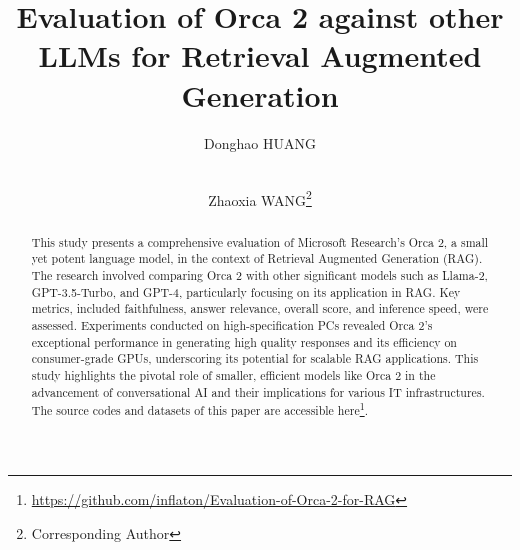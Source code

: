 \documentclass[runningheads]{llncs}
\begin{document}
%

\title{Evaluation of Orca 2 against other LLMs for Retrieval Augmented Generation}

\author{Donghao HUANG \and \\
Zhaoxia WANG\thanks{Corresponding Author}}

%

%
%
%
%
%
\maketitle              %
%
\begin{abstract}
This study presents a comprehensive evaluation of Microsoft Research's Orca 2, a small yet potent language model, in the context of Retrieval Augmented Generation (RAG). The research involved comparing Orca 2 with other significant models such as Llama-2, GPT-3.5-Turbo, and GPT-4, particularly focusing on its application in RAG. Key metrics, included faithfulness, answer relevance, overall score, and inference speed, were assessed. Experiments conducted on high-specification PCs revealed Orca 2's exceptional performance in generating high quality responses and its efficiency on consumer-grade GPUs, underscoring its potential for scalable RAG applications. This study highlights the pivotal role of smaller, efficient models like Orca 2 in the advancement of conversational AI and their implications for various IT infrastructures. The source codes and datasets of this paper are accessible here\footnote{\url{https://github.com/inflaton/Evaluation-of-Orca-2-for-RAG}}.

\end{abstract}
\end{document}
